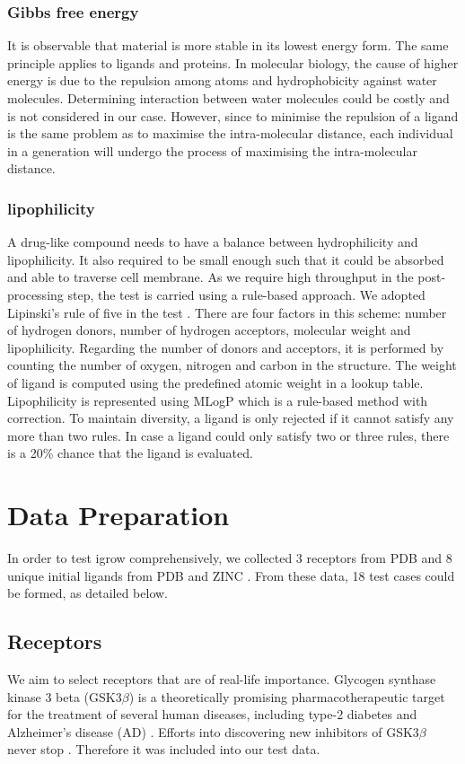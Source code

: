 \documentclass[10pt,conference,letterpaper]{IEEEtran}
\begin{document}
\subsubsection{Gibbs free energy}
It is observable that material is more stable in its lowest energy form.
The same principle applies to ligands and proteins.
In molecular biology, the cause of higher energy is due to the repulsion among atoms and hydrophobicity against water molecules.
Determining interaction between water molecules could be costly and is not considered in our case.
However, since to minimise the repulsion of a ligand is the same problem as to maximise the intra-molecular distance, each individual in a generation will undergo the process of maximising the intra-molecular distance.

\subsubsection{lipophilicity}
A drug-like compound needs to have a balance between hydrophilicity and lipophilicity.
It also required to be small enough such that it could be absorbed and able to traverse cell membrane.
As we require high throughput in the post-processing step, the test is carried using a rule-based approach.
We adopted Lipinski's rule of five in the test \cite{ref19}.
There are four factors in this scheme: number of hydrogen donors, number of hydrogen acceptors, molecular weight and lipophilicity.
Regarding the number of donors and acceptors, it is performed by counting the number of oxygen, nitrogen and carbon in the structure.
The weight of ligand is computed using the predefined atomic weight in a lookup table.
Lipophilicity is represented using MLogP which is a rule-based method with correction.
To maintain diversity, a ligand is only rejected if it cannot satisfy any more than two rules.
In case a ligand could only satisfy two or three rules, there is a 20\% chance that the ligand is evaluated.

\section{Data Preparation}\label{sec:data preparation}
In order to test igrow comprehensively, we collected 3 receptors from PDB \cite{96} and 8 unique initial ligands from PDB and ZINC \cite{55}. From these data, 18 test cases could be formed, as detailed below.

\subsection{Receptors}
We aim to select receptors that are of real-life importance. Glycogen synthase kinase 3 beta (GSK3$\beta$) is a theoretically promising pharmacotherapeutic target for the treatment of several human diseases, including type-2 diabetes \cite{247} and Alzheimer's disease (AD) \cite{248}.
Efforts into discovering new inhibitors of GSK3$\beta$ never stop \cite{246}.
Therefore it was included into our test data.
\end{document}
